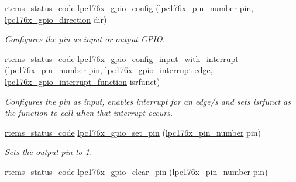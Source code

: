 \begin{DoxyCompactItemize}
\item 
\mbox{\hyperlink{group__ClassicStatus_ga545d41846817eaba6143d52ee4d9e9fe}{rtems\+\_\+status\+\_\+code}} \mbox{\hyperlink{lpc-gpio_8h_a9565e4ec4013f20eadb825db494a612e}{lpc176x\+\_\+gpio\+\_\+config}} (\mbox{\hyperlink{common-types_8h_a8215ced1557c43bc5925b691a3c1dc23}{lpc176x\+\_\+pin\+\_\+number}} pin, \mbox{\hyperlink{gpio-defs_8h_a0c9e959ab33ca3965f03caf07c8ecc17}{lpc176x\+\_\+gpio\+\_\+direction}} dir)
\begin{DoxyCompactList}\small\item\em Configures the pin as input or output G\+P\+IO. \end{DoxyCompactList}\item 
\mbox{\hyperlink{group__ClassicStatus_ga545d41846817eaba6143d52ee4d9e9fe}{rtems\+\_\+status\+\_\+code}} \mbox{\hyperlink{lpc-gpio_8h_a87097ba2ad9bf2907e08ff92a69d47c1}{lpc176x\+\_\+gpio\+\_\+config\+\_\+input\+\_\+with\+\_\+interrupt}} (\mbox{\hyperlink{common-types_8h_a8215ced1557c43bc5925b691a3c1dc23}{lpc176x\+\_\+pin\+\_\+number}} pin, \mbox{\hyperlink{gpio-defs_8h_afc30bf25b9862f6272f1bab077f8016b}{lpc176x\+\_\+gpio\+\_\+interrupt}} edge, \mbox{\hyperlink{gpio-defs_8h_aee89c4be418a21db878253cdf558ecc5}{lpc176x\+\_\+gpio\+\_\+interrupt\+\_\+function}} isrfunct)
\begin{DoxyCompactList}\small\item\em Configures the pin as input, enables interrupt for an edge/s and sets isrfunct as the function to call when that interrupt occurs. \end{DoxyCompactList}\item 
\mbox{\hyperlink{group__ClassicStatus_ga545d41846817eaba6143d52ee4d9e9fe}{rtems\+\_\+status\+\_\+code}} \mbox{\hyperlink{lpc-gpio_8h_a12fab16fff0e2652edab006c7c840a3d}{lpc176x\+\_\+gpio\+\_\+set\+\_\+pin}} (\mbox{\hyperlink{common-types_8h_a8215ced1557c43bc5925b691a3c1dc23}{lpc176x\+\_\+pin\+\_\+number}} pin)
\begin{DoxyCompactList}\small\item\em Sets the output pin to 1. \end{DoxyCompactList}\item 
\mbox{\hyperlink{group__ClassicStatus_ga545d41846817eaba6143d52ee4d9e9fe}{rtems\+\_\+status\+\_\+code}} \mbox{\hyperlink{lpc-gpio_8h_a3cdfeb2c478837ed69bf742954c7333a}{lpc176x\+\_\+gpio\+\_\+clear\+\_\+pin}} (\mbox{\hyperlink{common-types_8h_a8215ced1557c43bc5925b691a3c1dc23}{lpc176x\+\_\+pin\+\_\+number}} pin)

\end{DoxyCompactItemize}
